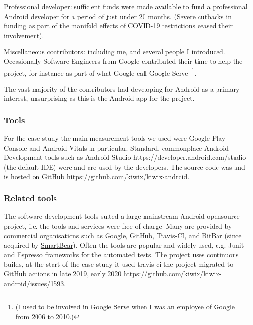 Professional developer: sufficient funds were made available to fund a professional Android developer for a period of just under 20 months. (Severe cutbacks in funding as part of the manifold effects of COVID-19 restrictions ceased their involvement).

Miscellaneous contributors: including me, and several people I introduced. Occasionally Software Engineers from Google contributed their time to help the project, for instance as part of what Google call Google Serve~\footnote{(I used to be involved in Google Serve when I was an employee of Google from 2006 to 2010.)}.


The vast majority of the contributors had developing for Android as a primary interest, unsurprising as this is the Android app for the project.

\subsubsection{Tools}
For the case study the main measurement tools we used were Google Play Console and Android Vitals in particular. Standard, commonplace Android Development tools such as Android Studio https://developer.android.com/studio (the default IDE) were and are used by the developers. The source code was and is hosted on GitHub \url{https://github.com/kiwix/kiwix-android}.


\subsubsection{Related tools}
The software development tools suited a large mainstream Android opensource project, i.e. the tools and services were free-of-charge. Many are provided by commercial organisations such as Google, GitHub, Travis-CI, and \href{https://bitbar.com/}{BitBar} (since acquired by \href{https://smartbear.com/}{SmartBear}). Often the tools are popular and widely used, e.g. Junit and Espresso frameworks for the automated tests. The project uses continuous builds, at the start of the case study it used travis-ci the project migrated to GitHub actions in late 2019, early 2020 \url{https://github.com/kiwix/kiwix-android/issues/1593}.

